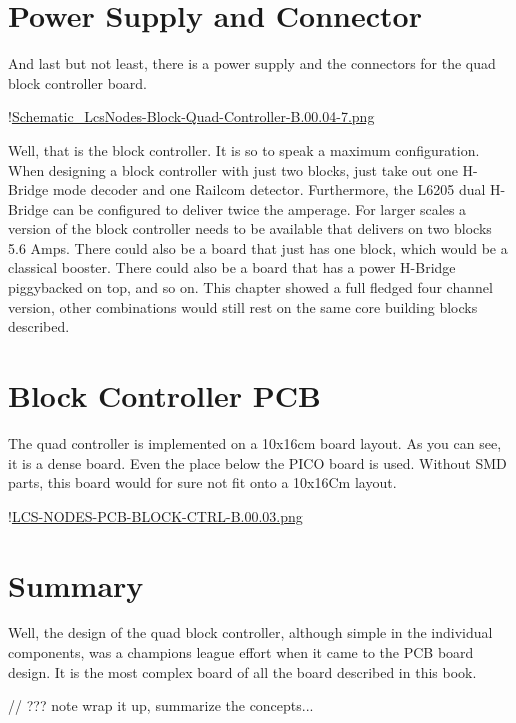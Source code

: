 \section{Power Supply and Connector}

And last but not least, there is a power supply and the connectors for the quad block controller board.

!\href{./Schematics/Schematic_LcsNodes-Block-Quad-Controller-B.00.04-7.png }{Schematic_LcsNodes-Block-Quad-Controller-B.00.04-7.png}

Well, that is the block controller. It is so to speak a maximum configuration. When designing a block controller with just two blocks, just take out one H-Bridge mode decoder and one Railcom detector. Furthermore, the L6205 dual H-Bridge can be configured to deliver twice the amperage. For larger scales a version of the block controller needs to be available that delivers on two blocks 5.6 Amps. There could also be a board that just has one block, which would be a classical booster. There could also be a board that has a power H-Bridge piggybacked on top, and so on. This chapter showed a full fledged four channel version, other combinations would still rest on the same core building blocks described.

\section{Block Controller PCB}

The quad controller is implemented on a 10x16cm board layout. As you can see, it is a dense board. Even the place below the PICO board is used. Without SMD parts, this board would for sure not fit onto a 10x16Cm layout.

!\href{./Boards/LCS-NODES-PCB-BLOCK-CTRL-B.00.03.png "}{LCS-NODES-PCB-BLOCK-CTRL-B.00.03.png}

\section{Summary}

Well, the design of the quad block controller, although simple in the individual components, was a champions league effort when it came to the PCB board design. It is the most complex board of all the board described in this book.

// ??? note wrap it up, summarize the concepts...

